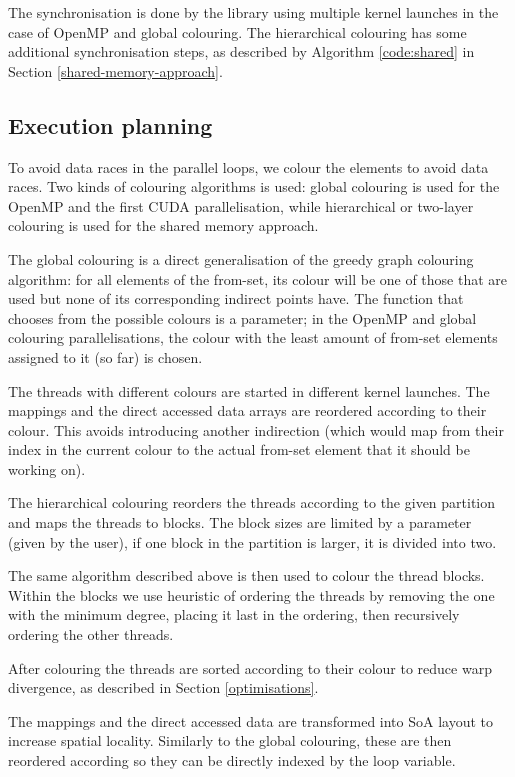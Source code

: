 The synchronisation is done by the library using multiple kernel launches in the
case of OpenMP and global colouring. The hierarchical colouring has some
additional synchronisation steps, as described by Algorithm \ref{code:shared} in
Section \ref{shared-memory-approach}.

\subsection{Execution planning}

To avoid data races in the parallel loops, we colour the elements to avoid data
races. Two kinds of colouring algorithms is used: global colouring is used for
the OpenMP and the first CUDA parallelisation, while hierarchical or two-layer
colouring is used for the shared memory approach.

The global colouring is a direct generalisation of the greedy graph colouring
algorithm: for all elements of the from-set, its colour will be one of those
that are used but none of its corresponding indirect points have. The function
that chooses from the possible colours is a parameter; in the OpenMP and global
colouring parallelisations, the colour with the least amount of from-set
elements assigned to it (so far) is chosen.

The threads with different colours are started in different kernel launches. The
mappings and the direct accessed data arrays are reordered according to their
colour. This avoids introducing another indirection (which would map from their
index in the current colour to the actual from-set element that it should be
working on).

The hierarchical colouring reorders the threads according to the given partition
and maps the threads to blocks. The block sizes are limited by a parameter
(given by the user), if one block in the partition is larger, it is divided into
two.

The same algorithm described above is then used to colour the thread blocks.
Within the blocks we use heuristic of ordering the threads by removing the one
with the minimum degree, placing it last in the ordering, then recursively
ordering the other threads.

After colouring the threads are sorted according to their colour to reduce warp
divergence, as described in Section \ref{optimisations}.

The mappings and the direct accessed data are transformed into SoA layout to
increase spatial locality. Similarly to the global colouring, these are then
reordered according so they can be directly indexed by the loop variable.

